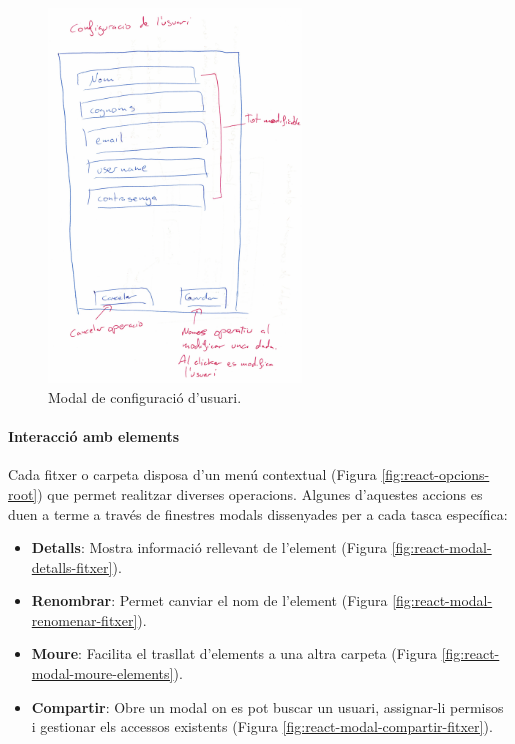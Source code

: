 \begin{figure}[H]
    \centering
    \includegraphics[width=0.6\textwidth]{Figures/interficies/react-modal-configuracio-usuari.jpg}
    \caption{Modal de configuració d'usuari.}
    \label{fig:react-modal-configuracio-usuari}
\end{figure}

\paragraph{Interacció amb elements}
Cada fitxer o carpeta disposa d'un menú contextual (Figura \ref{fig:react-opcions-root}) que permet realitzar diverses operacions. Algunes d'aquestes accions es duen a terme a través de finestres modals dissenyades per a cada tasca específica:
\begin{itemize}
    \item \textbf{Detalls}: Mostra informació rellevant de l'element (Figura \ref{fig:react-modal-detalls-fitxer}).
    \item \textbf{Renombrar}: Permet canviar el nom de l'element (Figura \ref{fig:react-modal-renomenar-fitxer}).
    \item \textbf{Moure}: Facilita el trasllat d'elements a una altra carpeta (Figura \ref{fig:react-modal-moure-elements}).
    \item \textbf{Compartir}: Obre un modal on es pot buscar un usuari, assignar-li permisos i gestionar els accessos existents (Figura \ref{fig:react-modal-compartir-fitxer}).
\end{itemize}

